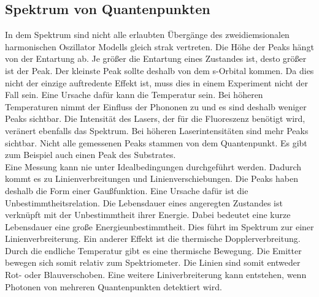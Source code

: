 \subsection{Spektrum von Quantenpunkten}
In dem Spektrum sind nicht alle erlaubten Übergänge des zweidiemsionalen harmonischen Oszillator Modells gleich strak vertreten. Die Höhe der Peaks hängt von der Entartung ab. Je größer die Entartung eines Zustandes ist, desto größer ist der Peak. Der kleinste Peak sollte deshalb von dem s-Orbital kommen. Da dies nicht der einzige auftredente Effekt ist, muss dies in einem Experiment nicht der Fall sein. Eine Ursache dafür kann die Temperatur sein. Bei höheren Temperaturen nimmt der Einfluss der Phononen zu und es sind deshalb weniger Peaks sichtbar. Die Intensität des Lasers, der für die Fluoreszenz benötigt wird, veränert ebenfalls das Spektrum. Bei höheren Laserintensitäten sind mehr Peaks sichtbar. Nicht alle gemessenen Peaks stammen von dem Quantenpunkt. Es gibt zum Beispiel auch einen Peak des Substrates. \\
Eine Messung kann nie unter Idealbedingungen durchgeführt werden. Dadurch kommt es zu Linienverbreitungen und Linienverschiebungen. Die Peaks haben deshalb die Form einer Gaußfunktion. Eine Ursache dafür ist die Unbestimmtheitsrelation. Die Lebensdauer eines angeregten Zustandes ist verknüpft mit der Unbestimmtheit ihrer Energie.  Dabei bedeutet eine kurze Lebensdauer eine große Energieunbestimmtheit. Dies führt im Spektrum zur einer Linienverbreiterung. Ein anderer Effekt ist die thermische Dopplerverbreitung. Durch die endliche Temperatur gibt es eine thermische Bewegung. Die Emitter bewegen sich somit relativ zum Spektriometer. Die Linien sind somit entweder Rot- oder Blauverschoben. Eine weitere Liniverbreiterung kann entstehen, wenn Photonen von mehreren Quantenpunkten detektiert wird. 
